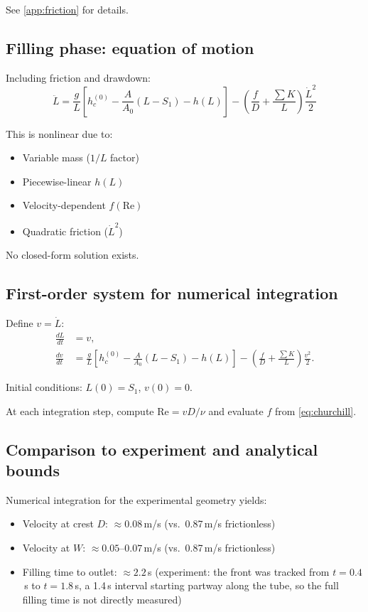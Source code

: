 \documentclass[11pt]{article}
\begin{document}
See \cref{app:friction} for details.

\subsection{Filling phase: equation of motion}

Including friction and drawdown:
\begin{equation}
  \boxed{\ddot{L} = \frac{g}{L}\left[h_c^{(0)} - \frac{A}{A_0}(L - S_1) - h(L)\right] - \left(\frac{f}{D} + \frac{\sum K}{L}\right)\frac{\dot{L}^2}{2}}
  \label{eq:filling-ODE}
\end{equation}

This is nonlinear due to:
\begin{itemize}[nosep,leftmargin=2em]
  \item Variable mass ($1/L$ factor)
  \item Piecewise-linear $h(L)$
  \item Velocity-dependent $f(\text{Re})$
  \item Quadratic friction ($\dot{L}^2$)
\end{itemize}

No closed-form solution exists.

\subsection{First-order system for numerical integration}

Define $v = \dot{L}$:
\begin{align}
  \frac{dL}{dt} &= v, \label{eq:system-L} \\
  \frac{dv}{dt} &= \frac{g}{L}\left[h_c^{(0)} - \frac{A}{A_0}(L - S_1) - h(L)\right] - \left(\frac{f}{D} + \frac{\sum K}{L}\right)\frac{v^2}{2}. \label{eq:system-v}
\end{align}

Initial conditions: $L(0) = S_1$, $v(0) = 0$.

At each integration step, compute $\text{Re} = vD/\nu$ and evaluate $f$ from \eqref{eq:churchill}.

\subsection{Comparison to experiment and analytical bounds}

Numerical integration for the experimental geometry yields:
\begin{itemize}[nosep,leftmargin=2em]
  \item Velocity at crest $D$: $\approx 0.08$\,m/s (vs.\ 0.87\,m/s frictionless)
  \item Velocity at $W$: $\approx 0.05$--$0.07$\,m/s (vs.\ 0.87\,m/s frictionless)
  \item Filling time to outlet: $\approx 2.2$\,s (experiment: the front was tracked from $t = 0.4$\,s to $t = 1.8$\,s, a 1.4\,s interval starting partway along the tube, so the full filling time is not directly measured)
\end{itemize}
\end{document}
